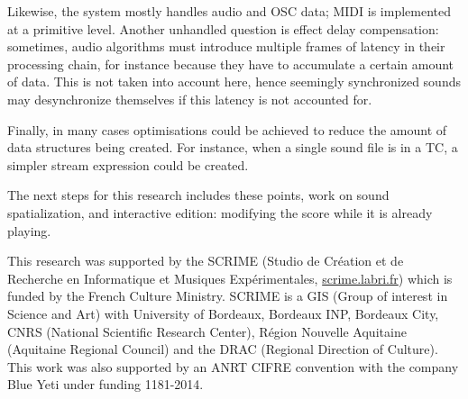 \documentclass{article}
\newcommand*{\timeconstraint}{\ac{TC}\xspace}
\begin{document}
Likewise, the system mostly handles audio and OSC data; MIDI is implemented at a primitive level.
Another unhandled question is effect delay compensation: sometimes, audio algorithms must introduce multiple frames of latency in their processing chain, for instance because they have to accumulate a certain amount of data.
This is not taken into account here, hence seemingly synchronized sounds may desynchronize themselves if this latency is not accounted for.

Finally, in many cases optimisations could be achieved to reduce the amount of data structures being created. For instance, when a single sound file is in a \timeconstraint, a simpler stream expression could be created.

The next steps for this research includes these points, work on sound spatialization, and interactive edition: modifying the score while it is already playing.

\begin{acknowledgments}
    This research was supported by the SCRIME (Studio de Création et de Recherche en Informatique et Musiques Expérimentales, \url{scrime.labri.fr}) which is funded by the French Culture Ministry. 
    SCRIME is a GIS (Group of interest in Science and Art) with University of Bordeaux, 
    Bordeaux INP, Bordeaux City, CNRS (National Scientific Research Center), Région Nouvelle Aquitaine (Aquitaine Regional Council) and the DRAC (Regional Direction of Culture).
	This work was also supported by an ANRT CIFRE convention with the company Blue Yeti under funding 1181-2014. 
\end{acknowledgments} 


\end{document}
